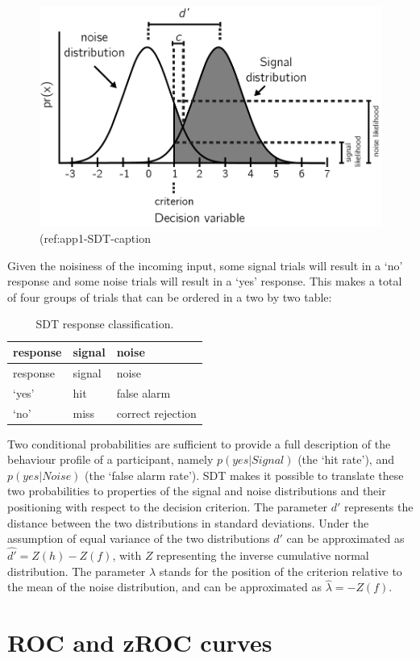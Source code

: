 \documentclass[12pt,twoside]{reedthesis}
\begin{document}
\begin{figure}
\includegraphics[width=0.7\linewidth]{figure/app-SDT/SDT_rep} \caption[Signal Detection Theory]{(ref:app1-SDT-caption}\label{fig:app1-SDT}
\end{figure}
Given the noisiness of the incoming input, some signal trials will result in a `no' response and some noise trials will result in a `yes' response. This makes a total of four groups of trials that can be ordered in a two by two table:
\begin{longtable}[]{@{}lll@{}}
\caption{\label{tab:app1SDT} SDT response classification.}\tabularnewline
\toprule
response & signal & noise\tabularnewline
\midrule
\endfirsthead
\toprule
response & signal & noise\tabularnewline
\midrule
\endhead
`yes' & hit & false alarm\tabularnewline
`no' & miss & correct rejection\tabularnewline
\bottomrule
\end{longtable}
Two conditional probabilities are sufficient to provide a full description of the behaviour profile of a participant, namely \(p(yes|Signal)\) (the `hit rate'), and \(p(yes|Noise)\) (the `false alarm rate'). SDT makes it possible to translate these two probabilities to properties of the signal and noise distributions and their positioning with respect to the decision criterion. The parameter \(d'\) represents the distance between the two distributions in standard deviations. Under the assumption of equal variance of the two distributions \(d'\) can be approximated as \(\hat{d'}=Z(h)-Z(f)\), with \(Z\) representing the inverse cumulative normal distribution. The parameter \(\lambda\) stands for the position of the criterion relative to the mean of the noise distribution, and can be approximated as \(\hat{\lambda}=-Z(f)\).

\hypertarget{app1:ROC}{%
\section{ROC and zROC curves}\label{app1:ROC}}
\end{document}
